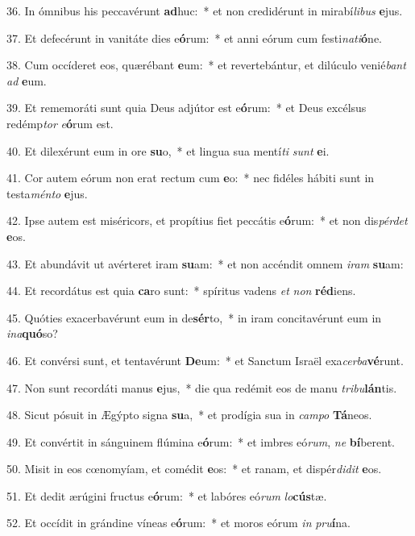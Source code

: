 36. In ómnibus his peccavérunt \textbf{ad}huc:~*  et non credidérunt in mirabí\textit{li}\textit{bus} \textbf{e}jus.\

37. Et defecérunt in vanitáte dies e\textbf{ó}rum:~*  et anni eórum cum festi\textit{na}\textit{ti}\textbf{ó}ne.\

38. Cum occíderet eos, quærébant \textbf{e}um:~*  et revertebántur, et dilúculo venié\textit{bant} \textit{ad} \textbf{e}um.\

39. Et rememoráti sunt quia Deus adjútor est e\textbf{ó}rum:~*  et Deus excélsus redémp\textit{tor} \textit{e}\textbf{ó}rum est.\

40. Et dilexérunt eum in ore \textbf{su}o,~*  et lingua sua mentí\textit{ti} \textit{sunt} \textbf{e}i.\

41. Cor autem eórum non erat rectum cum \textbf{e}o:~*  nec fidéles hábiti sunt in testa\textit{mén}\textit{to} \textbf{e}jus.\

42. Ipse autem est miséricors, et propítius fiet peccátis e\textbf{ó}rum:~*  et non dis\textit{pér}\textit{det} \textbf{e}os.\

43. Et abundávit ut avérteret iram \textbf{su}am:~*  et non accéndit omnem \textit{i}\textit{ram} \textbf{su}am:\

44. Et recordátus est quia \textbf{ca}ro sunt:~*  spíritus vadens \textit{et} \textit{non} \textbf{réd}iens.\

45. Quóties exacerbavérunt eum in de\textbf{sér}to,~*  in iram concitavérunt eum in \textit{in}\textit{a}\textbf{quó}so?\

46. Et convérsi sunt, et tentavérunt \textbf{De}um:~*  et Sanctum Israël exa\textit{cer}\textit{ba}\textbf{vé}runt.\

47. Non sunt recordáti manus \textbf{e}jus,~*  die qua redémit eos de manu \textit{tri}\textit{bu}\textbf{lán}tis.\

48. Sicut pósuit in Ægýpto signa \textbf{su}a,~*  et prodígia sua in \textit{cam}\textit{po} \textbf{Tá}neos.\

49. Et convértit in sánguinem flúmina e\textbf{ó}rum:~*  et imbres eó\textit{rum}, \textit{ne} \textbf{bí}berent.\

50. Misit in eos cœnomyíam, et comédit \textbf{e}os:~*  et ranam, et dispér\textit{di}\textit{dit} \textbf{e}os.\

51. Et dedit ærúgini fructus e\textbf{ó}rum:~*  et labóres eó\textit{rum} \textit{lo}\textbf{cús}tæ.\

52. Et occídit in grándine víneas e\textbf{ó}rum:~*  et moros eórum \textit{in} \textit{pru}\textbf{í}na.\

